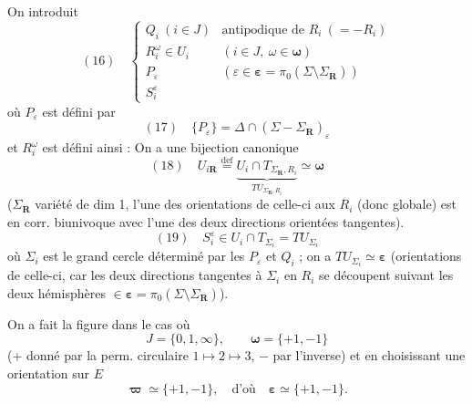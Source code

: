 \documentclass[11pt,a4paper]{article}
\begin{document}
On introduit
\[
  (16)\quad
  \left\{
  \begin{array}{ll}
    Q_i \ (i \in J) & \text{antipodique de } R_i \ (= -R_i) \\
    R_i^{\omega} \in U_i & (i \in J,\ \omega \in \boldsymbol{\omega}) \\
    P_{\varepsilon} & (\varepsilon \in \boldsymbol{\varepsilon}
      = \pi_0(\Sigma \setminus \Sigma_{\mathbf{R}})) \\
    S_i^{\varepsilon} &
  \end{array}
  \right.
\]
où $P_\varepsilon$ est défini par
\[
  (17)\quad \{P_\varepsilon\} = \Delta \cap (\Sigma - \Sigma_{\mathbf{R}})_\varepsilon
\]
 et $R_i^{\omega}$ est défini ainsi :
On a une bijection canonique
\[
  (18)\quad
  U_{i\mathbf{R}} \overset{\mathrm{def}}{=}
  \underbrace{U_i \cap T_{\Sigma_{\mathbf{R}},R_i}}_{TU_{\Sigma_{\mathbf{R}},R_i}}
  \simeq \boldsymbol{\omega}
\]
($\Sigma_{\mathbf{R}}$ variété de dim 1, l'une des orientations de celle-ci aux
 $R_i$ (donc globale) est en corr. biunivoque avec l'une des deux
directions orientées tangentes).
\[
  (19)\quad S_i^{\varepsilon} \in U_i \cap T_{\Sigma_i} = TU_{\Sigma_i}
\]
\struck{\ill{}}
où $\Sigma_i$ est le grand cercle déterminé par les $P_\varepsilon$ et $Q_i$ ; on a
$TU_{\Sigma_i} \simeq \boldsymbol{\varepsilon}$ (orientations de celle-ci, car les deux
directions tangentes à $\Sigma_i$ en $R_i$ se découpent suivant les deux hémisphères
$\in \boldsymbol{\varepsilon} = \pi_0(\Sigma \setminus \Sigma_{\mathbf{R}})$).

On a fait la figure dans le cas où
\[
  J = \{0, 1, \infty\}, \qquad \boldsymbol{\omega} = \{+1, -1\}
\]
($+$ donné par la perm. circulaire $1 \mapsto 2 \mapsto 3$, $-$ par l'inverse) et en
choisissant une orientation sur $E$
\[
  \boldsymbol{\varpi} \simeq \{+1, -1\}, \quad \text{d'où} \quad
  \boldsymbol{\varepsilon} \simeq \{+1, -1\} .
\]
\end{document}
